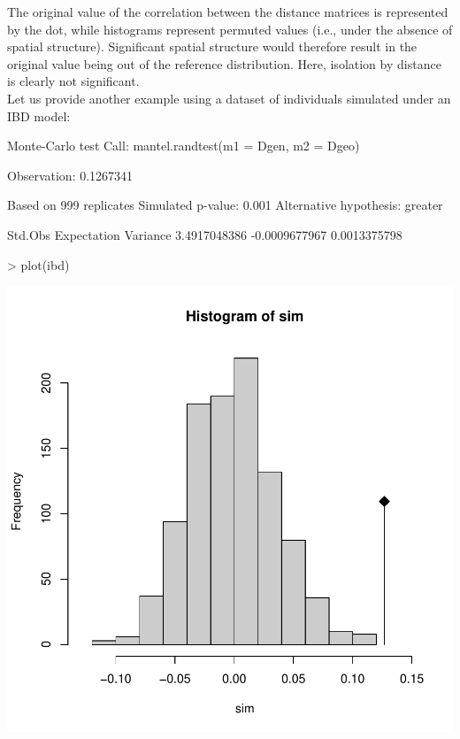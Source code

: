 \documentclass{article}
\begin{document}
\noindent The original value of the correlation between the distance matrices is represented by the
dot, while histograms represent permuted values (i.e., under the absence of spatial structure).
Significant spatial structure would therefore result in the original value being out of the
reference distribution.
Here, isolation by distance is clearly not significant.
\\


Let us provide another example using a dataset of individuals simulated under an IBD model:
\begin{Schunk}
\begin{Soutput}
Monte-Carlo test
Call: mantel.randtest(m1 = Dgen, m2 = Dgeo)

Observation: 0.1267341 

Based on 999 replicates
Simulated p-value: 0.001 
Alternative hypothesis: greater 

      Std.Obs   Expectation      Variance 
 3.4917048386 -0.0009677967  0.0013375798 
\end{Soutput}
\end{Schunk}
\begin{Schunk}
\begin{Sinput}
> plot(ibd)
\end{Sinput}
\end{Schunk}
\includegraphics{figs/base-082}
\end{document}
